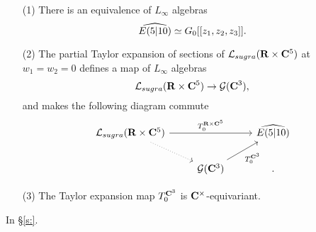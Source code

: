 \documentclass[11pt]{amsart}
\begin{document}
\begin{lem}
\begin{itemize}
\item[(1)]
There is an equivalence of $L_\infty$ algebras
\[
\Hat{E(5|10)} \simeq G_0 [[z_1,z_2,z_3]] .
\]
\item[(2)]The partial Taylor expansion of sections of $\cL_{sugra}(\R \times \C^5)$ at $w_1=w_2 = 0$ defines a map of $L_\infty$ algebras 
\[
\cL_{sugra}(\R \times \C^5) \to \cG(\C^3) ,
\]
and makes the following diagram commute
\[
\begin{tikzcd}
\cL_{sugra}(\R \times \C^5) \ar[dr,dotted] \ar[rr,"T_0^{\R \times \C^5}"] & &  \Hat{E(5|10)} \\ 
& \cG(\C^3) \ar[ur,"T_0^{\C^3}"'] & .
\end{tikzcd} 
\]
\item[(3)] 
The Taylor expansion map $T_0^{\C^3}$ is $\C^\times$-equivariant. 
\end{itemize}
\end{lem}


In \S \ref{s:}. 
\end{document}
